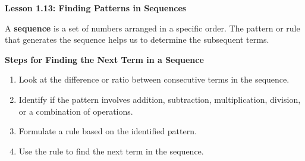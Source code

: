 \begin{center}
\textbf{Lesson 1.13: Finding Patterns in Sequences}
\end{center}

\vspace*{1ex}

 A \textbf{sequence} is a set of numbers arranged in a specific order. The pattern or rule that generates the sequence helps us to determine the subsequent terms.
	
	\textbf{Steps for Finding the Next Term in a Sequence}
	\begin{enumerate}[label = \color{blue}\arabic*. ]
		\item Look at the difference or ratio between consecutive terms in the sequence.
		\item Identify if the pattern involves addition, subtraction, multiplication, division, or a combination of operations.
		\item Formulate a rule based on the identified pattern.
		\item Use the rule to find the next term in the sequence.
	\end{enumerate}
	
	 